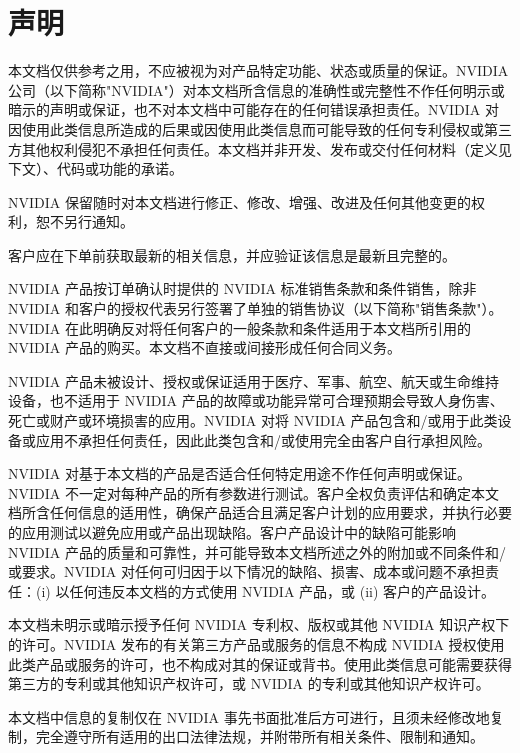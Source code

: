 \documentclass[11pt,UTF8,fontset=fandol,openany]{ctexrep}
\begin{document}
\newpage

\chapter{声明}

本文档仅供参考之用，不应被视为对产品特定功能、状态或质量的保证。NVIDIA 公司（以下简称"NVIDIA"）对本文档所含信息的准确性或完整性不作任何明示或暗示的声明或保证，也不对本文档中可能存在的任何错误承担责任。NVIDIA 对因使用此类信息所造成的后果或因使用此类信息而可能导致的任何专利侵权或第三方其他权利侵犯不承担任何责任。本文档并非开发、发布或交付任何材料（定义见下文）、代码或功能的承诺。

NVIDIA 保留随时对本文档进行修正、修改、增强、改进及任何其他变更的权利，恕不另行通知。

客户应在下单前获取最新的相关信息，并应验证该信息是最新且完整的。

NVIDIA 产品按订单确认时提供的 NVIDIA 标准销售条款和条件销售，除非 NVIDIA 和客户的授权代表另行签署了单独的销售协议（以下简称"销售条款"）。NVIDIA 在此明确反对将任何客户的一般条款和条件适用于本文档所引用的 NVIDIA 产品的购买。本文档不直接或间接形成任何合同义务。

NVIDIA 产品未被设计、授权或保证适用于医疗、军事、航空、航天或生命维持设备，也不适用于 NVIDIA 产品的故障或功能异常可合理预期会导致人身伤害、死亡或财产或环境损害的应用。NVIDIA 对将 NVIDIA 产品包含和/或用于此类设备或应用不承担任何责任，因此此类包含和/或使用完全由客户自行承担风险。

NVIDIA 对基于本文档的产品是否适合任何特定用途不作任何声明或保证。NVIDIA 不一定对每种产品的所有参数进行测试。客户全权负责评估和确定本文档所含任何信息的适用性，确保产品适合且满足客户计划的应用要求，并执行必要的应用测试以避免应用或产品出现缺陷。客户产品设计中的缺陷可能影响 NVIDIA 产品的质量和可靠性，并可能导致本文档所述之外的附加或不同条件和/或要求。NVIDIA 对任何可归因于以下情况的缺陷、损害、成本或问题不承担责任：(i) 以任何违反本文档的方式使用 NVIDIA 产品，或 (ii) 客户的产品设计。

本文档未明示或暗示授予任何 NVIDIA 专利权、版权或其他 NVIDIA 知识产权下的许可。NVIDIA 发布的有关第三方产品或服务的信息不构成 NVIDIA 授权使用此类产品或服务的许可，也不构成对其的保证或背书。使用此类信息可能需要获得第三方的专利或其他知识产权许可，或 NVIDIA 的专利或其他知识产权许可。

本文档中信息的复制仅在 NVIDIA 事先书面批准后方可进行，且须未经修改地复制，完全遵守所有适用的出口法律法规，并附带所有相关条件、限制和通知。
\end{document}
